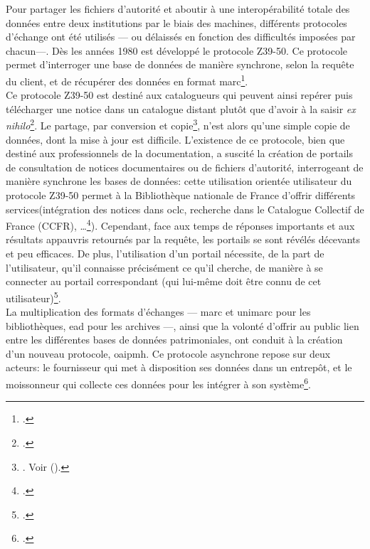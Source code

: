 Pour partager les fichiers d'autorité et aboutir à une interopérabilité totale des données entre deux institutions par le biais des machines, différents protocoles d'échange ont été utilisés --- ou délaissés en fonction des difficultés imposées par chacun---. Dès les années 1980 est développé le protocole Z39-50. Ce protocole permet d'interroger une base de données de manière synchrone, selon la requête du client, et de récupérer des données en format \ac{marc}\footcite{bibliotheque_nationale_de_france_protocole_nodate}.\\

Ce protocole Z39-50 est destiné aux catalogueurs qui peuvent ainsi \og repérer puis télécharger une notice dans un catalogue distant plutôt que d’avoir à la saisir \textit{ex nihilo}\fg{}\footcite{bermes_convergence_2013}. Le partage, \og par conversion et copie\fg{}\footnote{\cite{bermes_convergence_2013}. Voir  ().}, n'est alors qu'une simple copie de données, dont la mise à jour est difficile. L'existence de ce protocole, bien que destiné aux professionnels de la documentation, a suscité la création de portails de consultation de notices documentaires ou de fichiers d'autorité, interrogeant de manière synchrone les bases de données: cette utilisation orientée utilisateur du protocole Z39-50 permet à la Bibliothèque nationale de France d'offrir différents services(intégration des notices dans \ac{oclc}, recherche dans le Catalogue Collectif de France (CCFR), \dots\footcite{bibliotheque_nationale_de_france_protocole_nodate}). Cependant, face aux temps de réponses importants et aux résultats appauvris retournés par la requête, les portails se sont révélés décevants et peu efficaces. De plus, l'utilisation d'un portail nécessite, de la part de l'utilisateur, qu'il connaisse précisément ce qu'il cherche, de manière à se connecter au portail correspondant (qui lui-même doit être connu de cet utilisateur)\footcite{dalbin_approches_2011}.\\

La multiplication des formats d'échanges --- \ac{marc} et \ac{unimarc} pour les bibliothèques, \ac{ead} pour les archives ---, ainsi que la volonté d'offrir au public lien entre les différentes bases de données patrimoniales, ont conduit à la création d'un nouveau protocole, \ac{oaipmh}. Ce protocole asynchrone repose sur deux acteurs: le fournisseur qui met à disposition ses données dans un \og entrepôt\fg{}, et le moissonneur qui collecte ces données pour les intégrer à son système\footcite{bibliotheque_nationale_de_france_protocole_nodate-1}.\\

